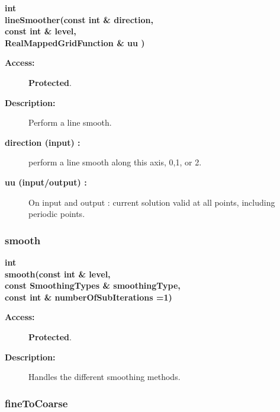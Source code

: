 \begin{flushleft} \textbf{%
int  \\ 
\settowidth{\EllipticGridGeneratorIncludeArgIndent}{lineSmoother(}%
lineSmoother(const int \& direction,\\ 
\hspace{\EllipticGridGeneratorIncludeArgIndent}const int \& level,\\ 
\hspace{\EllipticGridGeneratorIncludeArgIndent}RealMappedGridFunction \& uu )
}\end{flushleft}
\begin{description}
\item[{\bf Access:}]  {\bf Protected}.
\item[{\bf Description:}] 
   Perform a line smooth.
\item[{\bf direction (input) :}]  perform a line smooth along this axis, 0,1, or 2.
\item[{\bf uu (input/output) :}]  On input and output : current solution valid at all points, including periodic points.

\end{description}
\subsubsection{smooth}
 
\begin{flushleft} \textbf{%
int  \\ 
\settowidth{\EllipticGridGeneratorIncludeArgIndent}{smooth(}%
smooth(const int \& level, \\ 
\hspace{\EllipticGridGeneratorIncludeArgIndent}const SmoothingTypes \& smoothingType,\\ 
\hspace{\EllipticGridGeneratorIncludeArgIndent}const int \& numberOfSubIterations  =1)
}\end{flushleft}
\begin{description}
\item[{\bf Access:}]  {\bf Protected}.
\item[{\bf Description:}] 
   Handles the different smoothing methods.
\end{description}
\subsubsection{fineToCoarse}
 
